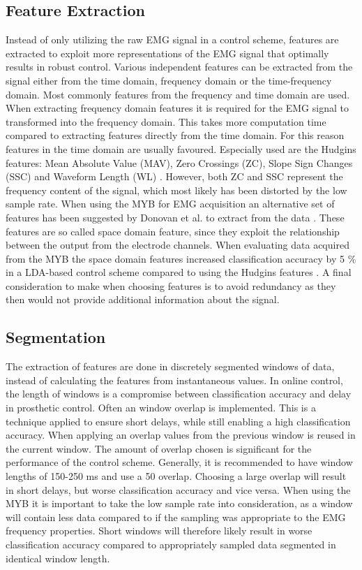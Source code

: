 \subsection{Feature Extraction}
Instead of only utilizing the raw EMG signal in a control scheme, features are extracted to exploit more representations of the EMG signal that optimally results in robust control. Various independent features can be extracted from the signal either from the time domain, frequency domain or the time-frequency domain. Most commonly features from the frequency and time domain are used. When extracting frequency domain features it is required for the EMG signal to transformed into the frequency domain. This takes more computation time compared to extracting features directly from the time domain. For this reason features in the time domain are usually favoured. \cite{Phiny2012} Especially used are the Hudgins features: Mean Absolute Value (MAV), Zero Crossings (ZC), Slope Sign Changes (SSC) and Waveform Length (WL) \cite{Hudgins1993}. However, both ZC and SSC represent the frequency content of the signal, which most likely has been distorted by the low sample rate. When using the MYB for EMG acquisition an alternative set of features has been suggested by Donovan et al. to extract from the data \cite{Donovan2017}. These features are so called space domain feature, since they exploit the relationship between the output from the electrode channels. When evaluating data acquired from the MYB the space domain features increased classification accuracy by 5 \% in a LDA-based control scheme compared to using the Hudgins features \cite{Donovan2017}. A final consideration to make when choosing features is to avoid redundancy as they then would not provide additional information about the signal. 

\subsection{Segmentation}
The extraction of features are done in discretely segmented windows of data, instead of calculating the features from instantaneous values. In online control, the length of windows is a compromise between classification accuracy and delay in prosthetic control. Often an window overlap is implemented. This is a technique applied to ensure short delays, while still enabling a high classification accuracy. When applying an overlap values from the previous window is reused in the current window. The amount of overlap chosen is significant for the performance of the control scheme.  Generally, it is recommended to have window lengths of 150-250 ms and use a 50 \percent overlap. Choosing a large overlap will result in short delays, but worse classification accuracy and vice versa. When using the MYB it is important to take the low sample rate into consideration, as a window will contain less data compared to if the sampling was appropriate to the EMG frequency properties. \cite{Menon2017} Short windows will therefore likely result in worse classification accuracy compared to appropriately sampled data segmented in identical window length.
